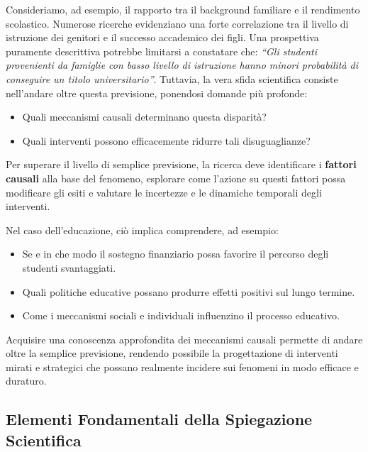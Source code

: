 \documentclass[
  letterpaper,
]{krantz}
\providecommand{\tightlist}{%
  \setlength{\itemsep}{0pt}\setlength{\parskip}{0pt}}\usepackage{longtable,booktabs,array}
\begin{document}
Consideriamo, ad esempio, il rapporto tra il background familiare e il
rendimento scolastico. Numerose ricerche evidenziano una forte
correlazione tra il livello di istruzione dei genitori e il successo
accademico dei figli. Una prospettiva puramente descrittiva potrebbe
limitarsi a constatare che: \emph{``Gli studenti provenienti da famiglie
con basso livello di istruzione hanno minori probabilità di conseguire
un titolo universitario''}. Tuttavia, la vera sfida scientifica consiste
nell'andare oltre questa previsione, ponendosi domande più profonde:

\begin{itemize}
\tightlist
\item
  Quali meccanismi causali determinano questa disparità?\\
\item
  Quali interventi possono efficacemente ridurre tali disuguaglianze?
\end{itemize}

Per superare il livello di semplice previsione, la ricerca deve
identificare i \textbf{fattori causali} alla base del fenomeno,
esplorare come l'azione su questi fattori possa modificare gli esiti e
valutare le incertezze e le dinamiche temporali degli interventi.

Nel caso dell'educazione, ciò implica comprendere, ad esempio:

\begin{itemize}
\tightlist
\item
  Se e in che modo il sostegno finanziario possa favorire il percorso
  degli studenti svantaggiati.\\
\item
  Quali politiche educative possano produrre effetti positivi sul lungo
  termine.\\
\item
  Come i meccanismi sociali e individuali influenzino il processo
  educativo.
\end{itemize}

Acquisire una conoscenza approfondita dei meccanismi causali permette di
andare oltre la semplice previsione, rendendo possibile la progettazione
di interventi mirati e strategici che possano realmente incidere sui
fenomeni in modo efficace e duraturo.

\subsection{Elementi Fondamentali della Spiegazione
Scientifica}\label{elementi-fondamentali-della-spiegazione-scientifica}
\end{document}
